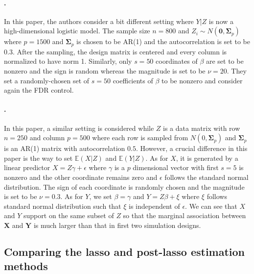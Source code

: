 \documentclass[12pt]{article}
\theoremstyle{definition}
\theoremstyle{remark}
\newcommand{\E}{\mathbb E}								%
\newcommand{\prx}{\bm X}								%
\newcommand{\pry}{{\bm Y}}								%
\begin{document}
\paragraph{\citet{CetL16}.}
In this paper, the authors consider a bit different setting where $Y|Z$ is now a high-dimensional logistic model. The sample size $n=800$ and $Z_i\sim N(\bm{0},\bm{\Sigma}_{p})$ where $p=1500$ and $\bm{\Sigma}_p$ is chosen to be AR(1) and the autocorrelation is set to be $0.3$. After the sampling, the design matrix is centered and every column is normalized to have norm 1. Similarly, only $s=50$ coordinates of $\beta$ are set to be nonzero and the sign is random whereas the magnitude is set to be $\nu=20$. They set a randomly-chosen set of $s=50$ coefficients of $\beta$ to be nonzero and consider again the FDR control.

\paragraph{\citet{Li2022}.}
In this paper, a similar setting is considered while $Z$ is a data matrix with row $n=250$ and column $p=500$ where each row is sampled from $N(0,\bm{\Sigma}_p)$ and $\bm{\Sigma}_p$ is an AR(1) matrix with autocorrelation $0.5$. However, a crucial difference in this paper is the way to set $\E(X|Z)$ and $\E(Y|Z)$. As for $X$, it is generated by a linear predictor $X=Z\gamma+\epsilon$ where $\gamma$ is a $p$ dimensional vector with first $s=5$ is nonzero and the other coordinate remains zero and $\epsilon$ follows the standard normal distribution. The sign of each coordinate is randomly chosen and the magnitude is set to be $\nu=0.3$. As for $Y$, we set $\beta=\gamma$ and $Y=Z\beta+\xi$ where $\xi$ follows standard normal distribution such that $\xi$ is independent of $\epsilon$. We can see that $X$ and $Y$ support on the same subset of $Z$ so that the marginal association between $\prx$ and $\pry$ is much larger than that in first two simulation designs.

\subsection{Comparing the lasso and post-lasso estimation methods} \label{sec:lasso-vs-plasso}
\end{document}
